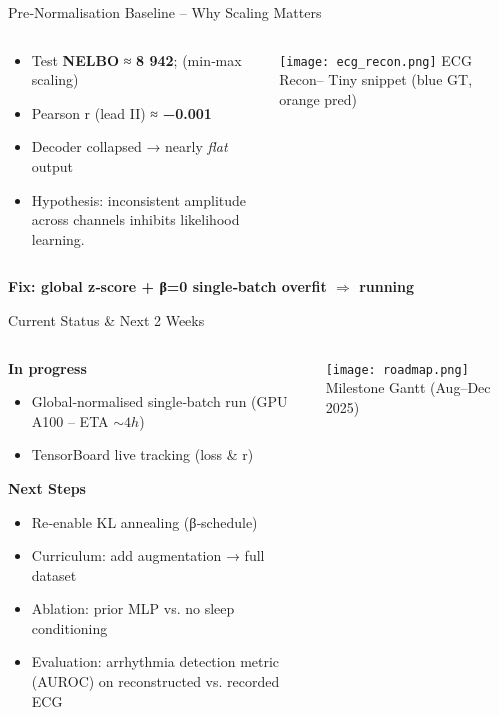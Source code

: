 \documentclass[aspectratio=169,11pt]{beamer}
\newcommand{\highlightbox}[2][tcairemred]{%
  \begin{center}
    \colorbox{#1!20}{\parbox{0.9\textwidth}{\centering\textcolor{#1}{\textbf{#2}}}}
  \end{center}}
\begin{document}
\begin{frame}{Pre‑Normalisation Baseline – Why Scaling Matters}
\begin{columns}[T]
\begin{column}{0.55\textwidth}
\begin{itemize}\itemsep0.3em
\item Test \textbf{NELBO} ≈ \textbf{8 942}; (min‑max scaling)
\item Pearson r (lead II) ≈ \textbf{−0.001}
\item Decoder collapsed → nearly \emph{flat} output
\item Hypothesis: inconsistent amplitude across channels inhibits likelihood learning.
\end{itemize}
\end{column}

\begin{column}{0.42\textwidth}
\centering
\texttt{[image: ecg\_recon.png]}
\tiny ECG Recon– Tiny snippet (blue GT, orange pred)
\end{column}
\end{columns}
\highlightbox[tcairemred]{Fix: global z‑score + β=0 single‑batch overfit $\Rightarrow$ running}
\end{frame}

\begin{frame}{Current Status \& Next 2 Weeks}
\begin{columns}[T]
\begin{column}{0.6\textwidth}
\textbf{In progress}
\begin{itemize}\itemsep0.25em
\item Global‑normalised single‑batch run (GPU A100 – ETA $\sim4 h$)
\item TensorBoard live tracking (loss \& r)
\end{itemize}

\vspace{0.4em}
\textbf{Next Steps}
\begin{itemize}\itemsep0.25em
\item Re‑enable KL annealing (β‑schedule)
\item Curriculum: add augmentation → full dataset
\item Ablation: prior MLP vs. no sleep conditioning
\item Evaluation: arrhythmia detection metric (AUROC) on reconstructed vs. recorded ECG
\end{itemize}
\end{column}

\begin{column}{0.38\textwidth}
\centering
\texttt{[image: roadmap.png]}
\tiny Milestone Gantt (Aug–Dec 2025)
\end{column}
\end{columns}
\end{frame}
\end{document}
